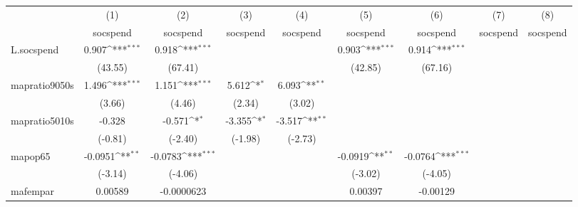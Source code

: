 {
\def\sym#1{\ifmmode^{#1}\else\(^{#1}\)\fi}
\begin{tabular}{l*{8}{c}}
\hline\hline
            &\multicolumn{1}{c}{(1)}&\multicolumn{1}{c}{(2)}&\multicolumn{1}{c}{(3)}&\multicolumn{1}{c}{(4)}&\multicolumn{1}{c}{(5)}&\multicolumn{1}{c}{(6)}&\multicolumn{1}{c}{(7)}&\multicolumn{1}{c}{(8)}\\
            &\multicolumn{1}{c}{socspend}&\multicolumn{1}{c}{socspend}&\multicolumn{1}{c}{socspend}&\multicolumn{1}{c}{socspend}&\multicolumn{1}{c}{socspend}&\multicolumn{1}{c}{socspend}&\multicolumn{1}{c}{socspend}&\multicolumn{1}{c}{socspend}\\
\hline
L.socspend  &       0.907\sym{***}&       0.918\sym{***}&                     &                     &       0.903\sym{***}&       0.914\sym{***}&                     &                     \\
            &     (43.55)         &     (67.41)         &                     &                     &     (42.85)         &     (67.16)         &                     &                     \\
[1em]
mapratio9050s&       1.496\sym{***}&       1.151\sym{***}&       5.612\sym{*}  &       6.093\sym{**} &                     &                     &                     &                     \\
            &      (3.66)         &      (4.46)         &      (2.34)         &      (3.02)         &                     &                     &                     &                     \\
[1em]
mapratio5010s&      -0.328         &      -0.571\sym{*}  &      -3.355\sym{*}  &      -3.517\sym{**} &                     &                     &                     &                     \\
            &     (-0.81)         &     (-2.40)         &     (-1.98)         &     (-2.73)         &                     &                     &                     &                     \\
[1em]
mapop65     &     -0.0951\sym{**} &     -0.0783\sym{***}&                     &                     &     -0.0919\sym{**} &     -0.0764\sym{***}&                     &                     \\
            &     (-3.14)         &     (-4.06)         &                     &                     &     (-3.02)         &     (-4.05)         &                     &                     \\
[1em]
mafempar    &     0.00589         &  -0.0000623         &                     &                     &     0.00397         &    -0.00129         &                     &                     \\

\end{tabular}}
